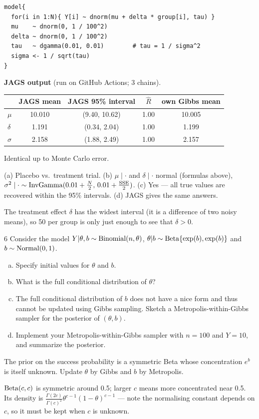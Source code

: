 \documentclass[11pt]{article}
\newenvironment{jagsbox}{\begin{sanity}\small\textbf{JAGS output} (run on GitHub Actions; 3 chains).\par\smallskip\centering}{\end{sanity}}
\newcommand{\JAGSexfive}{\begin{jagsbox}
\begin{tabular}{lccc|c}\toprule
 & JAGS mean & JAGS 95\% interval & $\hat R$ & own Gibbs mean\\\midrule
$\mu$ & 10.010 & (9.40, 10.62) & 1.00 & 10.005\\
$\delta$ & 1.191 & (0.34, 2.04) & 1.00 & 1.199\\
$\sigma$ & 2.158 & (1.88, 2.49) & 1.00 & 2.157\\\bottomrule
\end{tabular}\par\smallskip
Identical up to Monte Carlo error.
\end{jagsbox}}
\begin{document}
\begin{lstlisting}
model{
  for(i in 1:N){ Y[i] ~ dnorm(mu + delta * group[i], tau) }
  mu    ~ dnorm(0, 1 / 100^2)
  delta ~ dnorm(0, 1 / 100^2)
  tau   ~ dgamma(0.01, 0.01)        # tau = 1 / sigma^2
  sigma <- 1 / sqrt(tau)
}
\end{lstlisting}
\JAGSexfive

\begin{answer}
(a) Placebo vs.\ treatment trial. (b) $\mu\mid\cdot$ and $\delta\mid\cdot$ normal (formulas above), $\sigma^2\mid\cdot\sim\mathrm{InvGamma}(0.01+\frac N2,\,0.01+\frac{\text{SSE}}2)$.
(c) Yes --- all true values are recovered within the 95\% intervals. (d) JAGS gives the same answers.
\end{answer}

\begin{takeaway}
The treatment effect $\delta$ has the widest interval (it is a difference of two noisy means), so 50 per group is only just enough to see that $\delta>0$.
\end{takeaway}


\begin{problem}{6}
Consider the model $Y|\theta,b\sim\mathrm{Binomial}(n,\theta)$, $\theta|b\sim\mathrm{Beta}\{\exp(b),\exp(b)\}$ and $b\sim\mathrm{Normal}(0,1)$.
\begin{enumerate}[(a)]
\item Specify initial values for $\theta$ and $b$.
\item What is the full conditional distribution of $\theta$?
\item The full conditional distribution of $b$ does not have a nice form and thus cannot be updated using Gibbs sampling. Sketch a Metropolis-within-Gibbs sampler for the posterior of $(\theta,b)$.
\item Implement your Metropolis-within-Gibbs sampler with $n=100$ and $Y=10$, and summarize the posterior.
\end{enumerate}
\end{problem}

\begin{restate}
The prior on the success probability is a symmetric Beta whose concentration $e^b$ is itself unknown. Update $\theta$ by Gibbs and $b$ by Metropolis.
\end{restate}

\begin{recall}
$\mathrm{Beta}(c,c)$ is symmetric around 0.5; larger $c$ means more concentrated near 0.5. Its density is $\frac{\Gamma(2c)}{\Gamma(c)^2}\theta^{c-1}(1-\theta)^{c-1}$ --- note the normalising constant depends on $c$, so it must be kept when $c$ is unknown.
\end{recall}
\end{document}
